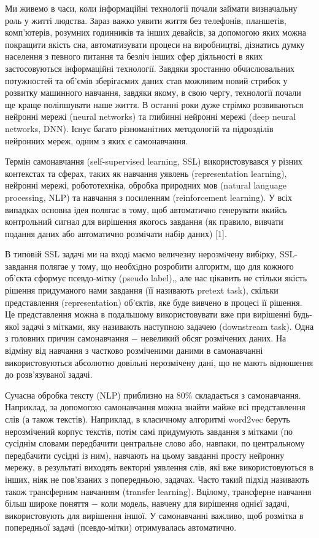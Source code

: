 
\hspace*{26pt}
Ми живемо в часи, коли інформаційні технології почали займати визначальну роль у житті людства. Зараз важко уявити життя без телефонів, планшетів, комп'ютерів, розумних годинників та інших девайсів, за допомогою яких можна покращити якість сна, автоматизувати процеси на виробництві, дізнатись думку населення з певного питання та безліч інших сфер діяльності в яких застосовуються інформаційні технології. Завдяки зростанню обчислювальних потужностей та об'ємів зберігаємих даних став можливим новий стрибок у розвитку машинного навчання, завдяки якому, в свою чергу, технології почали ще краще поліпшувати наше життя. В останні роки дуже стрімко розвиваються нейронні мережі (neural networks) та глибинні нейронні мережі (deep neural networks, DNN). Існує багато різноманітних методологій та підрозділів нейронних мереж, одним з яких є самонавчання.

Термін самонавчання (self-supervised learning, SSL) використовувався у різних контекстах та сферах, таких як навчання уявлень (representation learning), нейронні мережі, робототехніка, обробка природних мов (natural language processing, NLP) та навчання з посиленням (reinforcement learning). У всіх випадках основна ідея полягає в тому, щоб автоматично генерувати якийсь контрольний сигнал для вирішення якогось завдання (як правило, вивчати подання даних або автоматично розмічати набір даних) [1].

В типовiй SSL задачi ми на входi маємо величезну нерозмiчену вибiрку, SSL-завдання полягае у тому, що необхiдно розробити алгоритм, що для кожного об’єкта сформує псевдо-мiтку (pseudo label),, але нас цікавить не стільки якість рішення придуманого нами завдання (її називають pretext task), скільки представлення (representation) об'єктів, яке буде вивчено в процесі її рішення. Це представлення можна в подальшому використовувати вже при вирішенні будь-якої задачі з мітками, яку називають наступною задачею (downstream task). Одна з головних причин самонавчання $-$ невеликий обсяг розмічених даних. На відміну від навчання з частково розміченими даними в самонавчанні використовуються абсолютно довільні нерозмічену дані, що не мають відношення до розв'язуваної задачі.

Сучасна обробка тексту (NLP) приблизно на 80\% складається з самонавчання. Наприклад, за допомогою самонавчання можна знайти майже всі представлення слів (а також текстів). Наприклад, в класичному алгоритмі word2vec беруть нерозмічений корпус текстів, потім самі придумують завдання з мітками (по сусіднім словами передбачити центральне слово або, навпаки, по центральному передбачити сусідні із ним), навчають на цьому завданні просту нейронну мережу, в результаті виходять векторні уявлення слів, які вже використовуються в інших, ніяк не пов'язаних з попередньою, задачах. Часто такий підхід називають також трансферним навчанням (transfer learning). Вцілому, трансферне навчання більш широке поняття $-$ коли модель, навчену для вирішення однієї задачі, використовують для вирішення іншої. У самонавчанні важливо, щоб розмітка в попередньої задачі (псевдо-мітки) отримувалась автоматично. 

